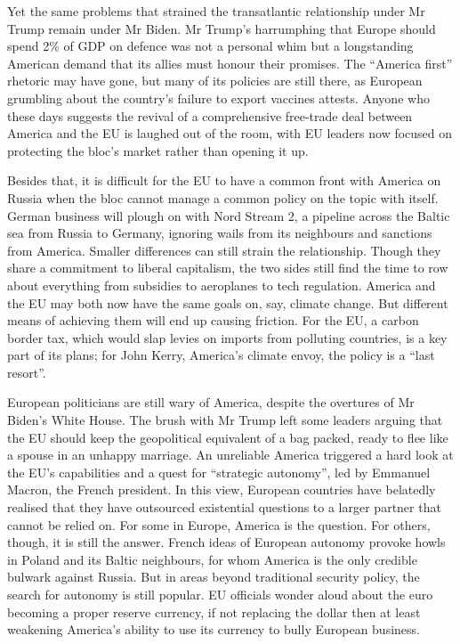 \documentclass{article}
\begin{document}
Yet the same problems that strained the transatlantic relationship under Mr Trump remain under Mr Biden. Mr Trump's harrumphing that Europe should spend 2\% of GDP on defence was not a personal whim but a longstanding American demand that its allies must honour their promises. The ``America first'' rhetoric may have gone, but many of its policies are still there, as European grumbling about the country's failure to export vaccines attests. Anyone who these days suggests the revival of a comprehensive free-trade deal between America and the EU is laughed out of the room, with EU leaders now focused on protecting the bloc's market rather than opening it up. 

Besides that, it is difficult for the EU to have a common front with America on Russia when the bloc cannot manage a common policy on the topic with itself. German business will plough on with Nord Stream 2, a pipeline across the Baltic sea from Russia to Germany, ignoring wails from its neighbours and sanctions from America. Smaller differences can still strain the relationship. Though they share a commitment to liberal capitalism, the two sides still find the time to row about everything from subsidies to aeroplanes to tech regulation. America and the EU may both now have the same goals on, say, climate change. But different means of achieving them will end up causing friction. For the EU, a carbon border tax, which would slap levies on imports from polluting countries, is a key part of its plans; for John Kerry, America's climate envoy, the policy is a ``last resort''. 

European politicians are still wary of America, despite the overtures of Mr Biden's White House. The brush with Mr Trump left some leaders arguing that the EU should keep the geopolitical equivalent of a bag packed, ready to flee like a spouse in an unhappy marriage. An unreliable America triggered a hard look at the EU's capabilities and a quest for ``strategic autonomy'', led by Emmanuel Macron, the French president. In this view, European countries have belatedly realised that they have outsourced existential questions to a larger partner that cannot be relied on. For some in Europe, America is the question. For others, though, it is still the answer. French ideas of European autonomy provoke howls in Poland and its Baltic neighbours, for whom America is the only credible bulwark against Russia. But in areas beyond traditional security policy, the search for autonomy is still popular. EU officials wonder aloud about the euro becoming a proper reserve currency, if not replacing the dollar then at least weakening America's ability to use its currency to bully European business. 
\end{document}
